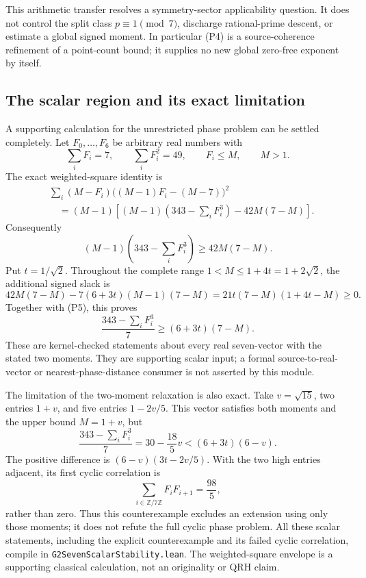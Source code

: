 \documentclass[11pt]{article}
\begin{document}
This arithmetic transfer resolves a symmetry-sector applicability question.
It does not control the split class \(p\equiv1\pmod7\), discharge
rational-prime descent, or estimate a global signed moment. In particular
(P4) is a source-coherence refinement of a point-count bound; it supplies
no new global zero-free exponent by itself.

\subsection{The scalar region and its exact limitation}

A supporting calculation for the unrestricted phase problem can be
settled completely. Let \(F_0,\ldots,F_6\) be arbitrary real numbers with
\[
 \sum_iF_i=7,\qquad \sum_iF_i^2=49,\qquad F_i\le M,\qquad M>1.
\]
The exact weighted-square identity is
\[
\begin{split}
 &\sum_i(M-F_i)\big((M-1)F_i-(M-7)\big)^2\\
 &\quad=(M-1)\left[(M-1)\left(343-\sum_iF_i^3\right)
                     -42M(7-M)\right].
\end{split}
\]
Consequently
\[
 (M-1)\left(343-\sum_iF_i^3\right)\ge42M(7-M).             \tag{P5}
\]
Put \(t=1/\sqrt2\). Throughout the complete range
\(1<M\le1+4t=1+2\sqrt2\), the additional signed slack is
\[
 42M(7-M)-7(6+3t)(M-1)(7-M)
   =21t(7-M)(1+4t-M)\ge0.
\]
Together with (P5), this proves
\[
 \frac{343-\sum_iF_i^3}{7}\ge(6+3t)(7-M).                 \tag{P6}
\]
These are kernel-checked statements about every real seven-vector with
the stated two moments. They are supporting scalar input; a formal
source-to-real-vector or nearest-phase-distance consumer is not asserted
by this module.

The limitation of the two-moment relaxation is also exact. Take
\(v=\sqrt{15}\), two entries \(1+v\), and five entries \(1-2v/5\).
This vector satisfies both moments and the upper bound \(M=1+v\), but
\[
 \frac{343-\sum_iF_i^3}{7}=30-\frac{18}5v
 <(6+3t)(6-v).
\]
The positive difference is
\((6-v)(3t-2v/5)\). With the two high entries adjacent, its first cyclic
correlation is
\[
 \sum_{i\in\mathbb Z/7\mathbb Z}F_iF_{i+1}=\frac{98}5,
\]
rather than zero. Thus this counterexample excludes an extension using
only those moments; it does not refute the full cyclic phase problem.
All these scalar statements, including the explicit counterexample and
its failed cyclic correlation, compile in
\texttt{G2SevenScalarStability.lean}. The weighted-square envelope is a
supporting classical calculation, not an originality or QRH claim.
\end{document}
